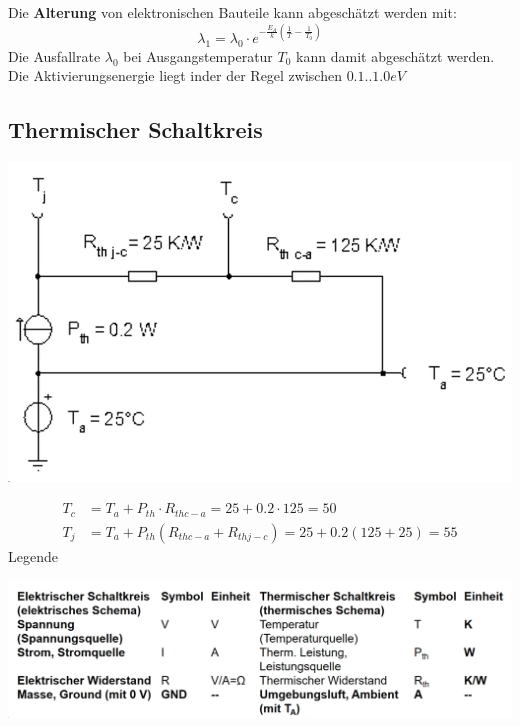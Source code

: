 Die \textbf{Alterung} von elektronischen Bauteile kann abgeschätzt werden mit:
\[
\lambda_1 = \lambda_0 \cdot e ^{-\frac{E_A}{k}\left(\frac{1}{T}-\frac{1}{T_0}\right)}
\]
Die Ausfallrate $\lambda_0$ bei Ausgangstemperatur $T_0$ kann damit abgeschätzt werden. Die Aktivierungsenergie liegt inder der Regel zwischen $0.1..1.0eV$

\subsection{Thermischer Schaltkreis}
\begin{center}
	\includegraphics[width=0.6\columnwidth]{Images/thermischerSchaltkreis1}
\end{center}
\begin{align*}
	T_c &= T_a + P_{th}\cdot R_{th c-a} = 25 + 0.2\cdot 125 = 50\\
	T_j &= T_a + P_{th}(R_{th c-a} + R_{th j-c}) = 25 + 0.2(125 + 25) = 55
\end{align*}
Legende
\begin{center}
	\includegraphics[width=0.8\columnwidth]{Images/thermischerSchaltkreis}
\end{center}
